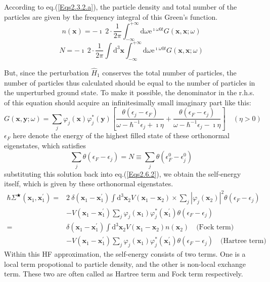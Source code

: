 According to eq.(\ref{Eqs2.3.2.a}), the particle density and total number of the particles are given by the frequency integral of this Green's function.
\[ n(\mathbf{x}) = - \imath \ 2 \cdot \frac{1}{2\pi} \int_{-\infty}^{+\infty} \mathrm{d} \omega \mathrm{e}^{\imath \omega  0 t} G(\mathbf{x},\mathbf{x};\omega) \]
\[ N = -\imath \ 2 \cdot \frac{1}{2\pi} \int \mathrm{d}^3 \mathbf{x} \int_{-\infty}^{+\infty} \mathrm{d} \omega \mathrm{e}^{\imath \omega  0 t} G(\mathbf{x},\mathbf{x};\omega) \]


But, since the perturbation $\hat{H}_1$ conserves the total number of particles, the number of particles thus calculated should be equal to the number of particles in the unperturbed ground state. To make it possible, the denominator in the r.h.s. of this equation should acquire an infinitesimally small imaginary part like this:
\begin{equation}\label{Eqs2.6.6}
G(\mathbf{x},\mathbf{y};\omega) = \sum_j \varphi_j(\mathbf{x}) \varphi_j^* (\mathbf{y})
\left[ \frac{\theta(\epsilon_j - \epsilon_F)}{\omega - \hbar^{-1}\epsilon_j + \imath \eta} + \frac{\theta(\epsilon_F - \epsilon_j)}{\omega - \hbar^{-1}\epsilon_j - \imath \eta} \right]   \quad (\eta > 0)
\end{equation}
$\epsilon_F $ here denote the energy of the highest filled state of these orthonormal eigenstates, which satisfies
\[ \sum_j \theta(\epsilon_F - \epsilon_j) = N \equiv \sum_j \theta(\epsilon_F^0 - \epsilon_j^0) \]
substituting this solution back into eq.(\ref{Eqs2.6.2}), we obtain the self-energy itself, which is given by these orthonormal eigenstates.
\begin{equation}\label{Eqs2.6.7} \begin{split}
 \hbar \Sigma^\bigstar (\mathbf{x}_1,\mathbf{x}_1^{'}) =
& 2 \ \delta(\mathbf{x}_1 - \mathbf{x}_1^{'}) \int \mathrm{d}^3 \mathbf{x}_2 V(\mathbf{x}_1 - \mathbf{x}_2) \times \sum_j |\varphi_j(\mathbf{x}_2)|^2 \theta(\epsilon_F - \epsilon_j) \\
&- V(\mathbf{x}_1 - \mathbf{x}_1^{'}) \sum_j \varphi_j (\mathbf{x}_1) \varphi_j^* (\mathbf{x}_1^{'}) \theta(\epsilon_F - \epsilon_j) \\
=& \delta(\mathbf{x}_1 - \mathbf{x}_1^{'}) \int \mathrm{d}^3 \mathbf{x}_2 V(\mathbf{x}_1 - \mathbf{x}_2) n(\mathbf{x}_2) \quad \text{(Fock term)}\\
&- V(\mathbf{x}_1 - \mathbf{x}_1^{'})\sum_j \varphi_j(\mathbf{x}_1)\varphi_j^*(\mathbf{x}_1^{'})\theta(\epsilon_F - \epsilon_j) \quad \text{(Hartree term)}
\end{split}\end{equation}
Within this HF approximation, the self-energy consists of two terms. One is a local term propotional to particle density, and the other is non-local exchange term. These two are often called as Hartree term and Fock term respectively.

